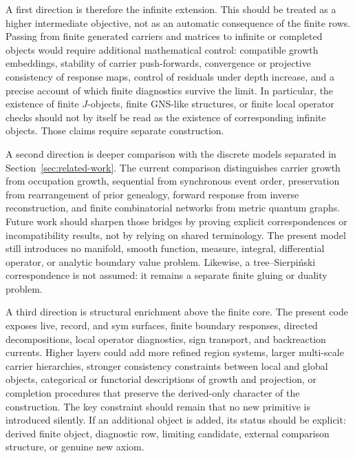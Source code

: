 \documentclass[11pt]{article}
\theoremstyle{remark}
\numberwithin{equation}{section}
\begin{document}
A first direction is therefore the infinite extension. This should be treated as a higher intermediate objective, not as an automatic consequence of the finite rows. Passing from finite generated carriers and matrices to infinite or completed objects would require additional mathematical control: compatible growth embeddings, stability of carrier push-forwards, convergence or projective consistency of response maps, control of residuals under depth increase, and a precise account of which finite diagnostics survive the limit. In particular, the existence of finite \(J\)-objects, finite GNS-like structures, or finite local operator checks should not by itself be read as the existence of corresponding infinite objects. Those claims require separate construction.

A second direction is deeper comparison with the discrete models separated in Section~\ref{sec:related-work}. The current comparison distinguishes carrier growth from occupation growth, sequential from synchronous event order, preservation from rearrangement of prior genealogy, forward response from inverse reconstruction, and finite combinatorial networks from metric quantum graphs. Future work should sharpen those bridges by proving explicit correspondences or incompatibility results, not by relying on shared terminology. The present model still introduces no manifold, smooth function, measure, integral, differential operator, or analytic boundary value problem. Likewise, a tree--Sierpi\'nski correspondence is not assumed: it remains a separate finite gluing or duality problem.

A third direction is structural enrichment above the finite core. The present code exposes live, record, and sym surfaces, finite boundary responses, directed decompositions, local operator diagnostics, sign transport, and backreaction currents. Higher layers could add more refined region systems, larger multi-scale carrier hierarchies, stronger consistency constraints between local and global objects, categorical or functorial descriptions of growth and projection, or completion procedures that preserve the derived-only character of the construction. The key constraint should remain that no new primitive is introduced silently. If an additional object is added, its status should be explicit: derived finite object, diagnostic row, limiting candidate, external comparison structure, or genuine new axiom.
\end{document}
